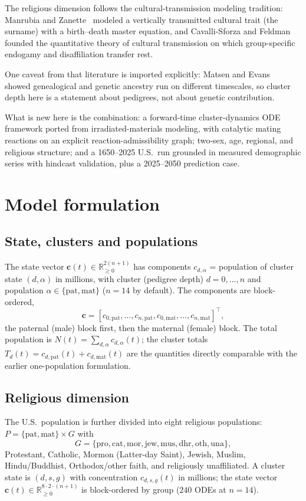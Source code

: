 \documentclass[11pt,a4paper]{article}
\begin{document}
The religious dimension follows the cultural-transmission modeling tradition:
Manrubia and Zanette~\cite{manrubia2002} modeled a vertically transmitted
cultural trait (the surname) with a birth--death master equation, and
Cavalli-Sforza and Feldman~\cite{cavalli-sforza1981} founded the quantitative
theory of cultural transmission on which group-specific endogamy and
disaffiliation transfer rest.

One caveat from that literature is imported explicitly:
Matsen and Evans~\cite{matsen2008} showed genealogical and genetic ancestry
run on different timescales, so cluster depth here is a statement about
pedigrees, not about genetic contribution.

What is new here is the combination: a forward-time cluster-dynamics ODE
framework ported from irradiated-materials modeling, with catalytic mating
reactions on an explicit reaction-admissibility graph; two-sex, age,
regional, and religious structure; and a 1650--2025 U.S.\ run grounded in
measured demographic series with hindcast validation, plus a 2025--2050
prediction case.

\section{Model formulation}
\subsection{State, clusters and populations}
The state vector $\mathbf{c}(t)\in\mathbb{R}^{2(n+1)}_{\ge 0}$ has components
$c_{d,\alpha}$ = population of cluster state $(d,\alpha)$ in millions, with
cluster (pedigree depth) $d=0,\dots,n$ and population
$\alpha\in\{\mathrm{pat},\mathrm{mat}\}$ ($n=14$ by default).  The components
are block-ordered,
\[
  \mathbf{c}=[c_{0,\mathrm{pat}},\dots,c_{n,\mathrm{pat}},
              c_{0,\mathrm{mat}},\dots,c_{n,\mathrm{mat}}]^\top,
\]
the paternal (male) block first, then the maternal (female) block.  The
total population is $N(t)=\sum_{d,\alpha}c_{d,\alpha}(t)$; the cluster
totals $T_d(t)=c_{d,\mathrm{pat}}(t)+c_{d,\mathrm{mat}}(t)$ are the quantities
directly comparable with the earlier one-population formulation.

\subsection{Religious dimension}
The U.S.\ population is further divided into eight religious populations:
$P=\{\mathrm{pat},\mathrm{mat}\}\times G$ with
\[
  G=\{\mathrm{pro},\mathrm{cat},\mathrm{mor},\mathrm{jew},
       \mathrm{mus},\mathrm{dhr},\mathrm{oth},\mathrm{una}\},
\]
Protestant, Catholic, Mormon (Latter-day Saint), Jewish, Muslim,
Hindu/Buddhist, Orthodox/other faith, and religiously unaffiliated.  A
cluster state is $(d,s,g)$ with concentration $c_{d,s,g}(t)$ in millions;
the state vector $\mathbf{c}(t)\in\mathbb{R}^{8\cdot2\cdot(n+1)}_{\ge0}$ is
block-ordered by group ($240$ ODEs at $n=14$).
\end{document}
